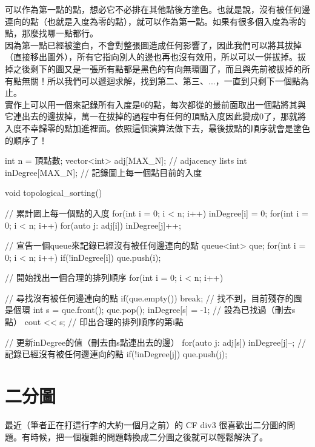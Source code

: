 可以作為第一點的點，想必它不必排在其他點後方塗色。也就是說，沒有被任何邊連向的點（也就是入度為零的點），就可以作為第一點。如果有很多個入度為零的點，那麼找哪一點都行。\\

因為第一點已經被塗白，不會對整張圖造成任何影響了，因此我們可以將其拔掉（直接移出圖外），所有它指向別人的邊也再也沒有效用，所以可以一併拔掉。拔掉之後剩下的圖又是一張所有點都是黑色的有向無環圖了，而且與先前被拔掉的所有點無關！所以我們可以遞迴求解，找到第二、第三、...，一直到只剩下一個點為止。\\

實作上可以用一個來記錄所有入度是$0$的點，每次都從的最前面取出一個點將其與它連出去的邊拔掉，萬一在拔掉的過程中有任何的頂點入度因此變成$0$了，那就將入度不幸歸零的點加進裡面。依照這個演算法做下去，最後拔點的順序就會是塗色的順序了！\\

\begin{C++}
int n = 頂點數;
vector<int> adj[MAX_N]; // adjacency lists
int inDegree[MAX_N];     // 記錄圖上每一個點目前的入度

void topological_sorting(){
    // 累計圖上每一個點的入度
    for(int i = 0; i < n; i++) inDegree[i] = 0;
    for(int i = 0; i < n; i++)
        for(auto j: adj[i])
            inDegree[j]++;

    // 宣告一個queue來記錄已經沒有被任何邊連向的點
    queue<int> que;
    for(int i = 0; i < n; i++)
        if(!inDegree[i]) que.push(i);

    // 開始找出一個合理的排列順序
    for(int i = 0; i < n; i++){
        // 尋找沒有被任何邊連向的點
        if(que.empty()) break; // 找不到，目前殘存的圖是個環
        int s = que.front(); que.pop();
        inDegree[s] = -1;      // 設為已找過（刪去s點）
        cout << s;             // 印出合理的排列順序的第i點

        // 更新inDegree的值（刪去由s點連出去的邊）
        for(auto j: adj[s]){
            inDegree[j]--;
            // 記錄已經沒有被任何邊連向的點
            if(!inDegree[j]) que.push(j);
        }
    }
}
\end{C++}

\section{二分圖}

最近（筆者正在打這行字的大約一個月之前）的 CF div3 很喜歡出二分圖的問題。有時候，把一個複雜的問題轉換成二分圖之後就可以輕鬆解決了。\\


